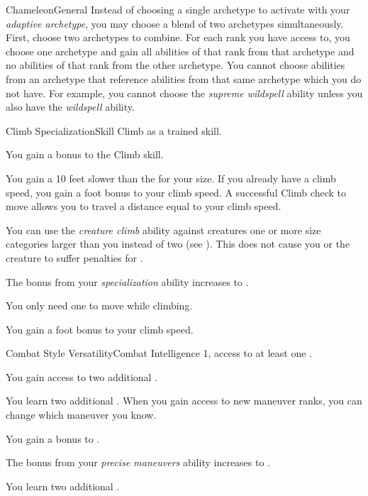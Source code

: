 \begin{feat}{Chameleon}{General}
         Instead of choosing a single archetype to activate with your \textit{adaptive archetype}, you may choose a blend of two archetypes simultaneously.
        First, choose two archetypes to combine.
        For each rank you have access to, you choose one archetype and gain all abilities of that rank from that archetype and no abilities of that rank from the other archetype.
        You cannot choose abilities from an archetype that reference abilities from that same archetype which you do not have.
        For example, you cannot choose the \textit{supreme wildspell} ability unless you also have the \textit{wildspell} ability.
    \end{feat}

    \begin{feat}{Climb Specialization}{Skill}
        \featpre Climb as a trained skill.

         You gain a  bonus to the Climb skill.

         You gain a  10 feet slower than the  for your size.
        If you already have a climb speed, you gain a  foot bonus to your climb speed.
        A successful Climb check to move allows you to travel a distance equal to your climb speed.

         You can use the \textit{creature climb} ability against creatures one or more size categories larger than you instead of two (see ).
        This does not cause you or the creature to suffer penalties for \squeezing.

         The bonus from your \textit{specialization} ability increases to .

         You only need one  to move while climbing.

         You gain a  foot bonus to your climb speed.
    \end{feat}

    \begin{feat}{Combat Style Versatility}{Combat}
        \featpre Intelligence 1, access to at least one .

         You gain access to two additional .

         You learn two additional .
        When you gain access to new maneuver ranks, you can change which maneuver you know.

         You gain a  bonus to .

         The bonus from your \textit{precise maneuvers} ability increases to .

         You learn two additional .
    \end{feat}

